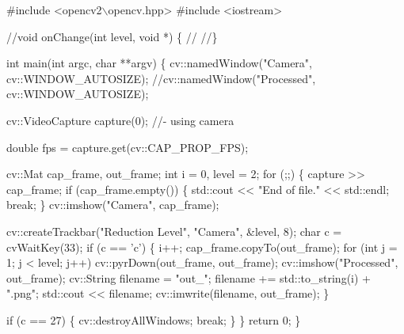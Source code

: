 \begin{DoxyCodeInclude}

\textcolor{preprocessor}{#include <opencv2\(\backslash\)opencv.hpp>}
\textcolor{preprocessor}{#include <iostream>}

\textcolor{comment}{//void onChange(int level, void *) \{}
\textcolor{comment}{//}
\textcolor{comment}{//\}}

\textcolor{keywordtype}{int} main(\textcolor{keywordtype}{int} argc, \textcolor{keywordtype}{char} **argv) \{
    cv::namedWindow(\textcolor{stringliteral}{"Camera"}, cv::WINDOW\_AUTOSIZE);
    \textcolor{comment}{//cv::namedWindow("Processed", cv::WINDOW\_AUTOSIZE);}

    cv::VideoCapture capture(0); \textcolor{comment}{//- using camera}

    \textcolor{keywordtype}{double} fps = capture.get(cv::CAP\_PROP\_FPS);

    cv::Mat cap\_frame, out\_frame;
    \textcolor{keywordtype}{int} i = 0, level = 2;
    \textcolor{keywordflow}{for} (;;) \{
        capture >> cap\_frame;
        \textcolor{keywordflow}{if} (cap\_frame.empty()) \{
            std::cout << \textcolor{stringliteral}{"End of file."}  << std::endl;
            \textcolor{keywordflow}{break};
        \}
        cv::imshow(\textcolor{stringliteral}{"Camera"}, cap\_frame);

        cv::createTrackbar(\textcolor{stringliteral}{"Reduction Level"}, \textcolor{stringliteral}{"Camera"}, &level, 8);
        \textcolor{keywordtype}{char} c = cvWaitKey(33);
        \textcolor{keywordflow}{if} (c == \textcolor{charliteral}{'c'}) \{
            i++;
            cap\_frame.copyTo(out\_frame);
            \textcolor{keywordflow}{for} (\textcolor{keywordtype}{int} j = 1; j < level; j++)
                cv::pyrDown(out\_frame, out\_frame);
            cv::imshow(\textcolor{stringliteral}{"Processed"}, out\_frame);
            cv::String filename = \textcolor{stringliteral}{"out\_"};
            filename += std::to\_string(i) + \textcolor{stringliteral}{".png"};
            std::cout << filename;
            cv::imwrite(filename, out\_frame);
        \}

        \textcolor{keywordflow}{if} (c == 27) \{
            cv::destroyAllWindows;
            \textcolor{keywordflow}{break};
        \}
    \}
    \textcolor{keywordflow}{return} 0;
\}
\end{DoxyCodeInclude}
 